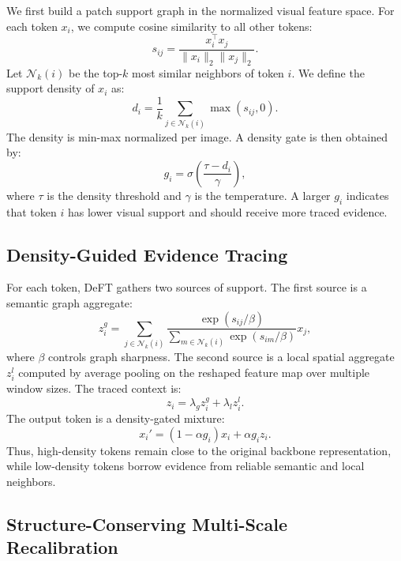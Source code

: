 \documentclass[letterpaper]{article}
\begin{document}
We first build a patch support graph in the normalized visual feature space. For
each token $x_i$, we compute cosine similarity to all other tokens:
\begin{equation}
    s_{ij} = \frac{x_i^\top x_j}{\|x_i\|_2 \|x_j\|_2}.
\end{equation}
Let $\mathcal{N}_k(i)$ be the top-$k$ most similar neighbors of token $i$. We
define the support density of $x_i$ as:
\begin{equation}
    d_i = \frac{1}{k} \sum_{j \in \mathcal{N}_k(i)} \max(s_{ij}, 0).
\end{equation}
The density is min-max normalized per image. A density gate is then obtained by:
\begin{equation}
    g_i = \sigma \left( \frac{\tau - d_i}{\gamma} \right),
\end{equation}
where $\tau$ is the density threshold and $\gamma$ is the temperature. A larger
$g_i$ indicates that token $i$ has lower visual support and should receive more
traced evidence.

\subsection{Density-Guided Evidence Tracing}

For each token, DeFT gathers two sources of support. The first source is a
semantic graph aggregate:
\begin{equation}
    z_i^{g} = \sum_{j \in \mathcal{N}_k(i)}
    \frac{\exp(s_{ij}/\beta)}{\sum_{m \in \mathcal{N}_k(i)} \exp(s_{im}/\beta)}
    x_j,
\end{equation}
where $\beta$ controls graph sharpness. The second source is a local spatial
aggregate $z_i^{l}$ computed by average pooling on the reshaped feature map over
multiple window sizes. The traced context is:
\begin{equation}
    z_i = \lambda_g z_i^g + \lambda_l z_i^l.
\end{equation}
The output token is a density-gated mixture:
\begin{equation}
    x_i' = (1 - \alpha g_i) x_i + \alpha g_i z_i.
\end{equation}
Thus, high-density tokens remain close to the original backbone representation,
while low-density tokens borrow evidence from reliable semantic and local
neighbors.

\subsection{Structure-Conserving Multi-Scale Recalibration}
\end{document}
